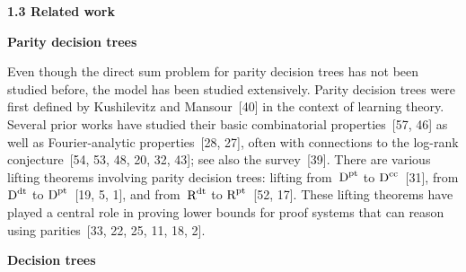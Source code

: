 




\par\medskip\noindent\textbf{
1.3 Related work}\par




\par\medskip\noindent\textbf{Parity decision trees}\par




Even though the direct sum problem for parity decision trees has not been studied before, the model has been studied extensively.
Parity decision trees were first defined by Kushilevitz and Mansour [40] in the context of learning theory. Several prior works have studied their basic combinatorial properties [57, 46] as well as Fourier-analytic properties [28, 27], often with connections to the log-rank conjecture [54, 53, 48, 20, 32, 43]; see also the survey [39]. There are various lifting theorems involving parity decision trees: lifting from ${\textup{D}}^{\textup{pt}}$ to ${\textup{D}}^{\textup{cc}}$ [31], from ${\textup{D}}^{\textup{dt}}$ to ${\textup{D}}^{\textup{pt}}$ [19, 5, 1], and from ${\textup{R}}^{\textup{dt}}$ to ${\textup{R}}^{\textup{pt}}$ [52, 17]. These lifting theorems have played a central role in proving lower bounds for proof systems that can reason using parities [33, 22, 25, 11, 18, 2].\par





\par\medskip\noindent\textbf{Decision trees}\par




